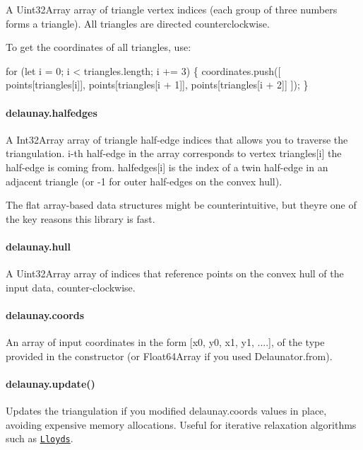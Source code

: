 A {\ttfamily Uint32\+Array} array of triangle vertex indices (each group of three numbers forms a triangle). All triangles are directed counterclockwise.

To get the coordinates of all triangles, use\+:


\begin{DoxyCode}
for (let i = 0; i < triangles.length; i += 3) \{
    coordinates.push([
        points[triangles[i]],
        points[triangles[i + 1]],
        points[triangles[i + 2]]
    ]);
\}
\end{DoxyCode}


\paragraph*{delaunay.\+halfedges}

A {\ttfamily Int32\+Array} array of triangle half-\/edge indices that allows you to traverse the triangulation. {\ttfamily i}-\/th half-\/edge in the array corresponds to vertex {\ttfamily triangles\mbox{[}i\mbox{]}} the half-\/edge is coming from. {\ttfamily halfedges\mbox{[}i\mbox{]}} is the index of a twin half-\/edge in an adjacent triangle (or {\ttfamily -\/1} for outer half-\/edges on the convex hull).

The flat array-\/based data structures might be counterintuitive, but they\textquotesingle{}re one of the key reasons this library is fast.

\paragraph*{delaunay.\+hull}

A {\ttfamily Uint32\+Array} array of indices that reference points on the convex hull of the input data, counter-\/clockwise.

\paragraph*{delaunay.\+coords}

An array of input coordinates in the form {\ttfamily \mbox{[}x0, y0, x1, y1, ....\mbox{]}}, of the type provided in the constructor (or {\ttfamily Float64\+Array} if you used {\ttfamily Delaunator.\+from}).

\paragraph*{delaunay.\+update()}

Updates the triangulation if you modified {\ttfamily delaunay.\+coords} values in place, avoiding expensive memory allocations. Useful for iterative relaxation algorithms such as \href{https://en.wikipedia.org/wiki/Lloyd%27s_algorithm}{\tt Lloyd\textquotesingle{}s}.

